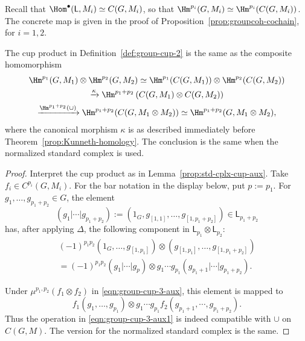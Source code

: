 Recall that $\Hom^\bullet(\mathsf{L},M_i)\simeq C(G,M_i)$, so that
$\Hm^{p_i}(G,M_i)\simeq\Hm^{p_i}(C(G,M_i))$. The concrete map is given in
the proof of Proposition~\ref{prop:groupcoh-cochain}, for $i=1,2$.

\begin{proposition}\label{prop:std-cplx-cup}
	The cup product in Definition~\ref{def:group-cup-2} is the same as the
	composite homomorphism
	\begin{multline*}
		\Hm^{p_1}(G, M_1) \otimes \Hm^{p_2}(G, M_2) \simeq \Hm^{p_1}(C(G, M_1)) \otimes \Hm^{p_2}(C(G, M_2)) \\
		\xrightarrow{\kappa} \Hm^{p_1 + p_2}\left( C(G, M_1) \otimes C(G, M_2) \right) \\
		\xrightarrow{\Hm^{p_1 + p_2}(\cup)} \Hm^{p_1 + p_2}(C(G, M_1 \otimes M_2)) \simeq \Hm^{p_1 + p_2}(G, M_1 \otimes M_2),
	\end{multline*}
	where the canonical morphism $\kappa$ is as described immediately before
	Theorem~\ref{prop:Kunneth-homology}. The conclusion is the same when the
	normalized standard complex is used.
\end{proposition}

\begin{proof}
	Interpret the cup product as in Lemma~\ref{prop:std-cplx-cup-aux}. Take
	$f_i\in C^{p_i}(G,M_i)$. For the bar notation in the display below, put
	$p:=p_1$. For $g_1,\ldots,g_{p_1+p_2}\in G$, the element
	\[ (g_1 | \cdots | g_{p_1 + p_2}) := \left(1_G, g_{[1, 1]}, \ldots, g_{[1, p_1 + p_2]} \right) \in \mathsf{L}_{p_1 + p_2} \]
	has, after applying $\Delta$, the following component in
	$\mathsf{L}_{p_1}\otimes\mathsf{L}_{p_2}$:
	\begin{multline*}
		(-1)^{p_1 p_2} \left( 1_G, \ldots, g_{[1, p_1]}\right) \otimes \left(g_{[1, p_1]}, \ldots, g_{[1, p_1 + p_2]} \right) \\
		= (-1)^{p_1 p_2} (g_1 | \cdots | g_p) \otimes g_1 \cdots g_{p_1} \left( g_{p_1 + 1} |\cdots| g_{p_1 + p_2} \right).
	\end{multline*}

	Under $\mu^{p_1,p_2}(f_1\otimes f_2)$ in
	\eqref{eqn:group-cup-3-aux}, this element is mapped to
	\[ f_1(g_1, \ldots, g_{p_1}) \otimes g_1 \cdots g_{p_1} f_2(g_{p_1 + 1}, \cdots, g_{p_1 + p_2}). \]
	Thus the operation in \eqref{eqn:group-cup-3-aux1} is indeed compatible
	with $\cup$ on $C(G,M)$. The version for the normalized standard complex
	is the same.
\end{proof}

